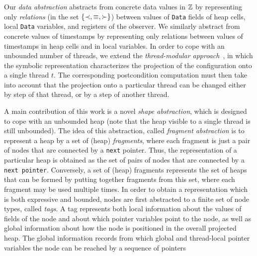 Our {\em data abstraction} abstracts from concrete data values in
${\mathbb Z}$ by representing only {\em relations}
(in the set $\left\{\prec,\equiv,\succ\right\}$) between values of {\tt Data} fields of 
heap cells, local {\tt Data} variables, and registers of the observer.
We similarly abstract from concrete values of timestamps by representing
only relations between values of timestamps in heap cells and in
local variables.
In order to cope with an unbounded number of threads,
we extend the {\em thread-modular approach}~\cite{BLMRS:cav08}, in which
the symbolic representation characterizes
the projection of the configuration onto a single thread $t$.
The corresponding postcondition computation must then take into account that
the projection onto a particular thread can be changed either by step of that
thread, or by a step of another thread.

A main contribution of this work is 
a novel {\em shape abstraction}, which is designed to cope with an unbounded
heap (note that the heap visible to a single thread is still unbounded).
The idea of this abstraction, called {\em fragment abstraction} is
to represent a heap by a set of (heap) {\em fragments}, where each fragment is
just a pair of nodes that are connected by a {\tt next} pointer. Thus, the
representation of a particular heap is obtained as the set of pairs of nodes
that are connected by a {\tt next pointer}. Conversely,
a set of (heap) fragments represents the set of heaps that can be formed by
putting together fragments from this set, where each fragment may be used
multiple times. In order to obtain a representation which is both expressive
and bounded, nodes are first abstracted to a finite set of node types, called
{\em tags}. A tag represents both local information about the values of
fields of the node
and about which pointer variables point to the node, as well as global
information about how the node is positioned in the overall projected heap.
The global information records from which global and thread-local pointer
variables the node can be reached by a sequence of pointers

